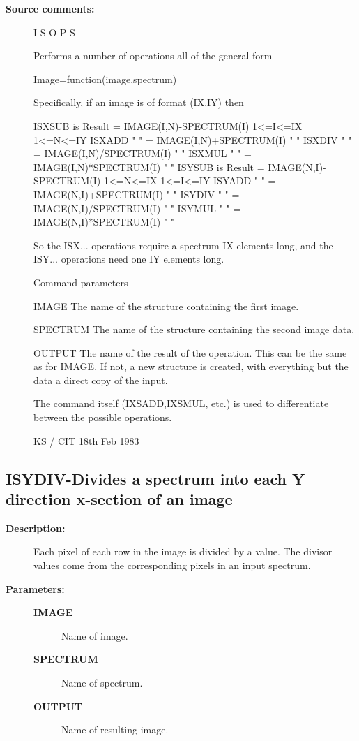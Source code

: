 \begin{description}
\begin{description}
\item [\textbf{Source comments:}]
\begin{terminalv}
 I S O P S

 Performs a number of operations all of the general form

 Image=function(image,spectrum)

 Specifically, if an image is of format (IX,IY) then

 ISXSUB is Result = IMAGE(I,N)-SPECTRUM(I) 1<=I<=IX 1<=N<=IY
 ISXADD  "   "    = IMAGE(I,N)+SPECTRUM(I)    "        "
 ISXDIV  "   "    = IMAGE(I,N)/SPECTRUM(I)    "        "
 ISXMUL  "   "    = IMAGE(I,N)*SPECTRUM(I)    "        "
 ISYSUB is Result = IMAGE(N,I)-SPECTRUM(I) 1<=N<=IX 1<=I<=IY
 ISYADD  "   "    = IMAGE(N,I)+SPECTRUM(I)    "        "
 ISYDIV  "   "    = IMAGE(N,I)/SPECTRUM(I)    "        "
 ISYMUL  "   "    = IMAGE(N,I)*SPECTRUM(I)    "        "

 So the ISX... operations require a spectrum IX elements long,
 and the ISY... operations need one IY elements long.

 Command parameters -

 IMAGE    The name of the structure containing the first image.

 SPECTRUM The name of the structure containing the second
          image data.

 OUTPUT   The name of the result of the operation.  This can
          be the same as for IMAGE.  If not, a new structure
          is created, with everything but the data a direct
          copy of the input.

 The command itself (IXSADD,IXSMUL, etc.) is used to
 differentiate between the possible operations.

                                  KS / CIT 18th Feb 1983
\end{terminalv}
\end{description}
\subsection{ISYDIV-\label{ISYDIV}Divides a spectrum into each Y direction x-section of an image}
\begin{description}

\item [\textbf{Description:}]
 Each pixel of each row in the image is divided by a value.
 The divisor values come from the corresponding pixels in an
 input spectrum.

\item [\textbf{Parameters:}]
\begin{description}
\item [\textbf{IMAGE}]
 Name of image.
\item [\textbf{SPECTRUM}]
 Name of spectrum.
\item [\textbf{OUTPUT}]
 Name of resulting image.
\end{description}


\end{description}
\end{description}
